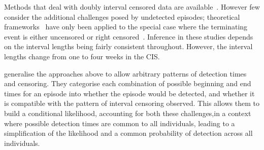 \documentclass[12pt]{article}
\newcommand\citePersonalComms[1]{(#1, personal communication)}
\begin{document}
Methods that deal with doubly interval censored data are available~\citep{sunStatistical,bogaertsSurvival}.
However few consider the additional challenges posed by undetected episodes; 
theoretical frameworks~\citep{turnbullEmpirical,dempsterMaximum} have only been applied to the special case where the terminating event is either uncensored or right censored~\citep[e.g.][]{sunEmpirical,bacchettiNonparametric,shenNonparametric}.
Inference in these studies depends on the interval lengths being fairly consistent throughout.
However, the interval lengths change from one to four weeks in the CIS. %

\citet{heiseyModelling} generalise the approaches above to allow arbitrary patterns of detection times and censoring.
They categorise each combination of possible beginning and end times for an episode into whether the episode would be detected, and whether it is compatible with the pattern of interval censoring observed.
This allows them to build a conditional likelihood, accounting for both these challenges,in a context where possible detection times are common to all individuals, leading to a simplification of the likelihood and a common probability of detection across all individuals.
\end{document}

